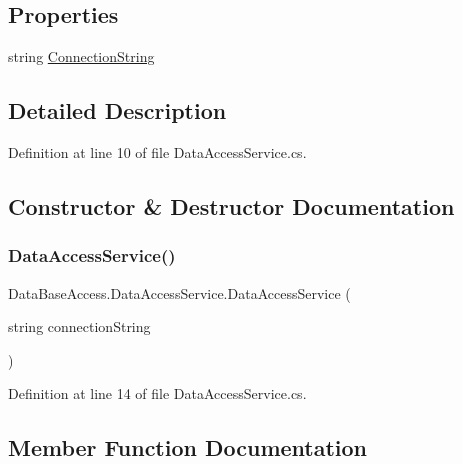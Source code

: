 \subsection*{Properties}
\begin{DoxyCompactItemize}
\item 
string \mbox{\hyperlink{classDataBaseAccess_1_1DataAccessService_a68fdde0329f29760ea79961cb70da656}{Connection\+String}}
\end{DoxyCompactItemize}


\subsection{Detailed Description}


Definition at line 10 of file Data\+Access\+Service.\+cs.



\subsection{Constructor \& Destructor Documentation}
\mbox{\label{classDataBaseAccess_1_1DataAccessService_a1a8ce18984787ddbb8ecf1aa0a71b003}} 
\subsubsection{\texorpdfstring{DataAccessService()}{DataAccessService()}}
{\footnotesize\ttfamily Data\+Base\+Access.\+Data\+Access\+Service.\+Data\+Access\+Service (\begin{DoxyParamCaption}\item[{string}]{connection\+String }\end{DoxyParamCaption})}



Definition at line 14 of file Data\+Access\+Service.\+cs.



\subsection{Member Function Documentation}
\mbox{\label{classDataBaseAccess_1_1DataAccessService_ac0ccfab11b8a047d85096cdf188e8e2f}} 
